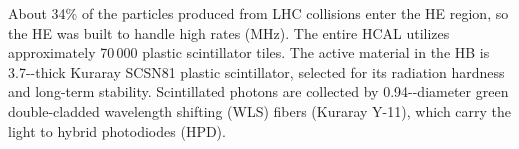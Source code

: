 About 34\% of the particles produced from LHC \pp collisions enter the HE region, so the HE was built to handle high rates (MHz).
The entire HCAL utilizes approximately 70\,000 plastic scintillator tiles.
The active material in the HB is 3.7-\mmns-thick Kuraray SCSN81 plastic scintillator, selected for its radiation hardness and long-term stability.
Scintillated photons are collected by 0.94-\mmns-diameter green double-cladded wavelength shifting (WLS) fibers (Kuraray Y-11), which carry the light to hybrid photodiodes (HPD).
